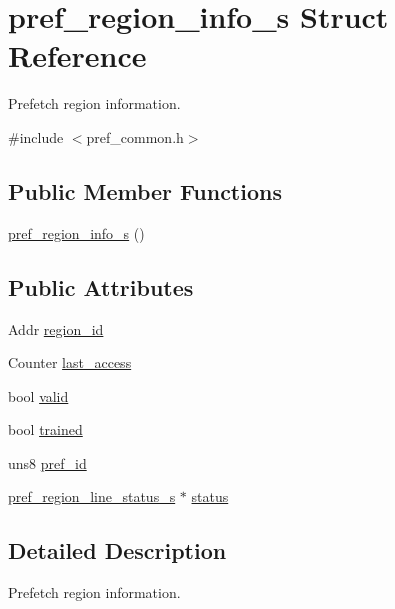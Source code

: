 \hypertarget{structpref__region__info__s}{
\section{pref\_\-region\_\-info\_\-s Struct Reference}
\label{structpref__region__info__s}
}


Prefetch region information.  




{\ttfamily \#include $<$pref\_\-common.h$>$}

\subsection*{Public Member Functions}
\begin{DoxyCompactItemize}
\item 
\hyperlink{structpref__region__info__s_abe4302c4dc36644139f1931f8ae60d7a}{pref\_\-region\_\-info\_\-s} ()
\end{DoxyCompactItemize}
\subsection*{Public Attributes}
\begin{DoxyCompactItemize}
\item 
Addr \hyperlink{structpref__region__info__s_a2365e6799e297f0107b7e9abd34eca8b}{region\_\-id}
\item 
Counter \hyperlink{structpref__region__info__s_a00cfcb04472cf7cf9c0beb50cac2a7b7}{last\_\-access}
\item 
bool \hyperlink{structpref__region__info__s_af5c8211c6d31be803eeab677457cb6df}{valid}
\item 
bool \hyperlink{structpref__region__info__s_a64ae1850a186f1cabe54fb98a14716d0}{trained}
\item 
uns8 \hyperlink{structpref__region__info__s_a7418a9a12dbe0cc8a6c87d2ee87b171d}{pref\_\-id}
\item 
\hyperlink{structpref__region__line__status__s}{pref\_\-region\_\-line\_\-status\_\-s} $\ast$ \hyperlink{structpref__region__info__s_ab3d02274c3da7cee73baf6d9b453ca89}{status}
\end{DoxyCompactItemize}


\subsection{Detailed Description}
Prefetch region information. 

